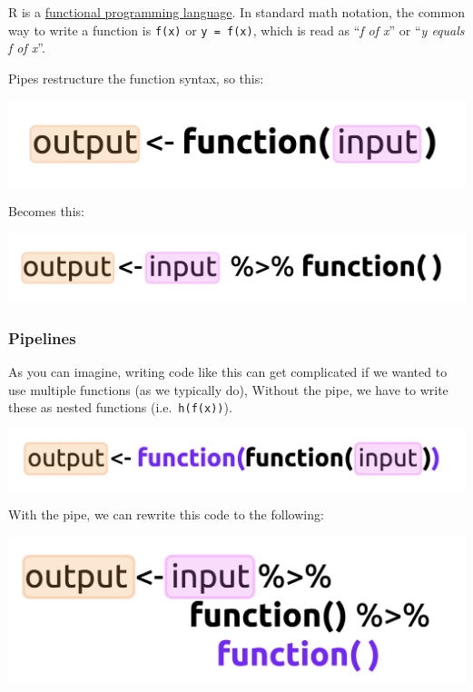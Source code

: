 \documentclass[11pt,]{article}
\begin{document}
R is a \href{https://adv-r.hadley.nz/fp.html}{functional programming
language}. In standard math notation, the common way to write a function
is \texttt{f(x)} or \texttt{y\ =\ f(x)}, which is read as ``\emph{f of
x}'' or ``\emph{y equals f of x}''.

Pipes restructure the function syntax, so this:

\begin{center}\includegraphics[width=19.06in]{img/pipe-args-01} \end{center}

Becomes this:

\begin{center}\includegraphics[width=22.56in]{img/pipe-args-02} \end{center}

\hypertarget{pipelines}{%
\subsubsection{Pipelines}\label{pipelines}}

As you can imagine, writing code like this can get complicated if we
wanted to use multiple functions (as we typically do), Without the pipe,
we have to write these as nested functions (i.e.~\texttt{h(f(x))}).

\begin{center}\includegraphics[width=24.81in]{img/pipe-args-03} \end{center}

With the pipe, we can rewrite this code to the following:

\begin{center}\includegraphics[width=18.56in]{img/pipe-args-04} \end{center}
\end{document}

